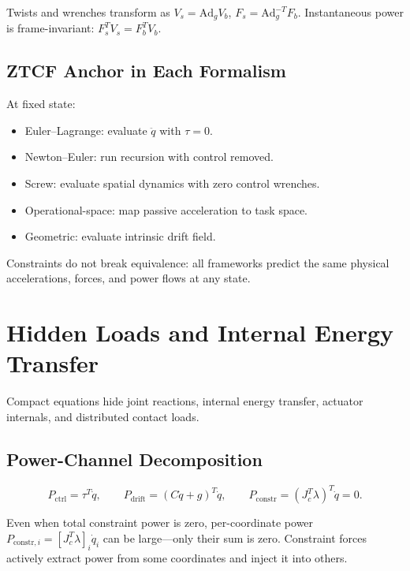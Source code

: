 \documentclass[11pt]{article}
\begin{document}
Twists and wrenches transform as $V_s=\mathrm{Ad}_g V_b$, $F_s=\mathrm{Ad}_g^{-T}F_b$.
Instantaneous power is frame-invariant: $F_s^TV_s = F_b^TV_b$.

\subsection{ZTCF Anchor in Each Formalism}

At fixed state:
\begin{itemize}
\item Euler--Lagrange: evaluate $\ddot{q}$ with $\tau=0$.
\item Newton--Euler: run recursion with control removed.
\item Screw: evaluate spatial dynamics with zero control wrenches.
\item Operational-space: map passive acceleration to task space.
\item Geometric: evaluate intrinsic drift field.
\end{itemize}

Constraints do not break equivalence: all frameworks predict the same physical accelerations, forces, and power flows at any state.


\section{Hidden Loads and Internal Energy Transfer}\label{sec:hidden-loads}

Compact equations hide joint reactions, internal energy transfer, actuator internals, and distributed contact loads.

\subsection{Power-Channel Decomposition}

\begin{equation}
P_{\mathrm{ctrl}}=\tau^T\dot{q}, \qquad
P_{\mathrm{drift}}=(C\dot{q}+g)^T\dot{q}, \qquad
P_{\mathrm{constr}}=(J_c^T\lambda)^T\dot{q}=0.
\end{equation}

Even when total constraint power is zero, per-coordinate power $P_{\mathrm{constr},i}=[J_c^T\lambda]_i\dot{q}_i$ can be large---only their sum is zero.
Constraint forces actively extract power from some coordinates and inject it into others.
\end{document}
